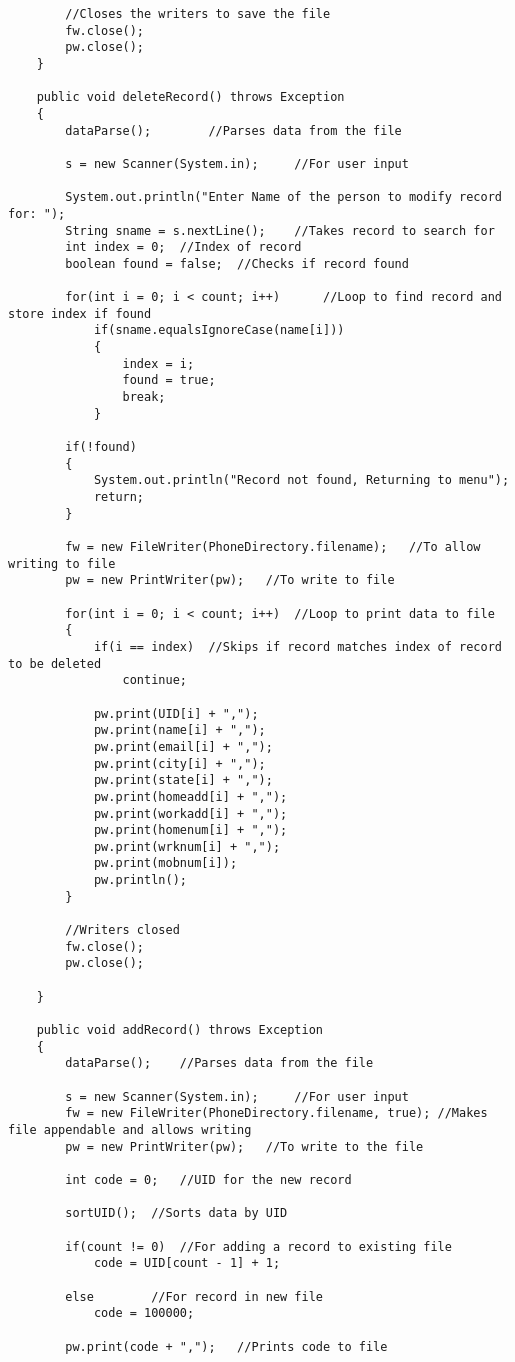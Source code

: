 \documentclass[ProgramminAssignment.tex]{subfiles}
\begin{document}
\begin{lstlisting}
		//Closes the writers to save the file
		fw.close();
		pw.close();
	}
	
	public void deleteRecord() throws Exception
	{
		dataParse();		//Parses data from the file
		
		s = new Scanner(System.in);		//For user input
		
		System.out.println("Enter Name of the person to modify record for: ");
		String sname = s.nextLine();	//Takes record to search for
		int index = 0;	//Index of record
		boolean found = false;	//Checks if record found
		
		for(int i = 0; i < count; i++)		//Loop to find record and store index if found
			if(sname.equalsIgnoreCase(name[i]))
			{
				index = i;
				found = true;
				break;
			}
		
		if(!found)
		{
			System.out.println("Record not found, Returning to menu");
			return;
		}
		
		fw = new FileWriter(PhoneDirectory.filename);	//To allow writing to file
		pw = new PrintWriter(pw);	//To write to file
		
		for(int i = 0; i < count; i++)	//Loop to print data to file
		{
			if(i == index)	//Skips if record matches index of record to be deleted
				continue;
			
			pw.print(UID[i] + ",");
			pw.print(name[i] + ",");
			pw.print(email[i] + ",");
			pw.print(city[i] + ",");
			pw.print(state[i] + ",");
			pw.print(homeadd[i] + ",");
			pw.print(workadd[i] + ",");
			pw.print(homenum[i] + ",");
			pw.print(wrknum[i] + ",");
			pw.print(mobnum[i]);
			pw.println();
		}
		
		//Writers closed
		fw.close();
		pw.close();
		
	}
	
	public void addRecord() throws Exception
	{
		dataParse();	//Parses data from the file
			
		s = new Scanner(System.in);		//For user input
		fw = new FileWriter(PhoneDirectory.filename, true);	//Makes file appendable and allows writing
		pw = new PrintWriter(pw);	//To write to the file
		
		int code = 0;	//UID for the new record
			
		sortUID();	//Sorts data by UID
		
		if(count != 0)	//For adding a record to existing file
			code = UID[count - 1] + 1;
		
		else		//For record in new file
			code = 100000;
		
		pw.print(code + ",");	//Prints code to file
		

\end{lstlisting}
\end{document}
